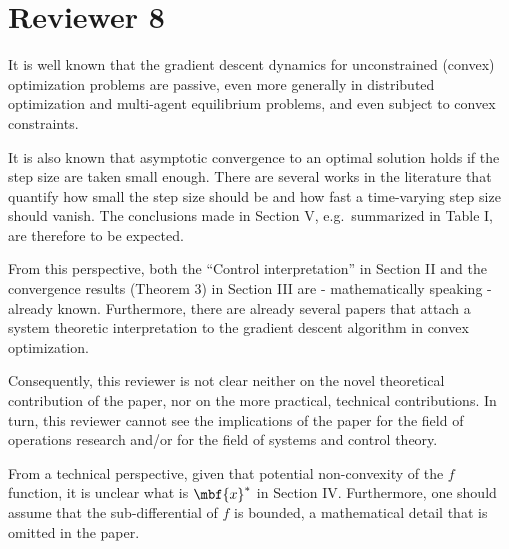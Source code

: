 \section*{Reviewer 8}\label{sec:reviewer8}
\renewcommand{\theequation}{R8.\arabic{equation}}
\setcounter{equation}{0}
\begin{rebuttal}[resovled]
    {%
        It is well known that the gradient descent dynamics for unconstrained (convex) optimization problems are passive, even more generally in distributed optimization and multi-agent equilibrium problems, and even subject to convex constraints.
    }%
    {%
    }%
\end{rebuttal}
\begin{rebuttal}[resovled]
    {%
        It is also known that asymptotic convergence to an optimal solution holds if the step size are taken small enough. There are several works in the literature that quantify how small the step size should be and how fast a time-varying step size should vanish. The conclusions made in Section V, e.g.\ summarized in Table I,  are therefore to be expected.
    }%
    {%
    }%
\end{rebuttal}
\begin{rebuttal}[resovled]
    {%
    From this perspective, both the ``Control interpretation'' in Section II  and the convergence results (Theorem 3) in Section III are - mathematically speaking - already known. Furthermore, there are already several papers that attach a system theoretic interpretation to the gradient descent algorithm in convex optimization.
    }%
    {%
    }%
\end{rebuttal}
\begin{rebuttal}[resovled]
    {%
    Consequently, this reviewer is not clear neither on the novel theoretical contribution of the paper, nor on the more practical, technical contributions. In turn, this reviewer cannot see the implications of the paper for the field of operations research and/or for the field of systems and control theory.
    }%
    {%
    }%
\end{rebuttal}
\begin{rebuttal}[stuck]
    {%
    From a technical perspective, given that potential non-convexity of the $f$ function, it is unclear what is $\mbf{x}^{\ast}$ in Section IV\@. Furthermore, one should assume that the sub-differential of $f$ is bounded, a mathematical detail that is omitted in the paper.
    }%
    {%
    }%
\end{rebuttal}
